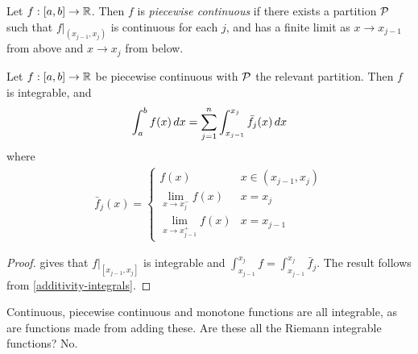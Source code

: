 \documentclass{../../template/note}
\begin{document}
    \begin{definition}
        Let \(f: [a, b] \to \mathbb R\). Then \(f\) is \emph{piecewise continuous} if there exists a partition \(\mathcal{P}\) such that \(\left.f\right|_{(x_{j-1},x_j)}\) is continuous for each \(j\), and has a finite limit as \(x \to x_{j-1}\) from above and \(x \to x_j\) from below.
    \end{definition}
    
    \begin{proposition}
        Let \(f: [a, b] \to \mathbb R\) be piecewise continuous with \(\mathcal{P}\) the relevant partition. Then \(f\) is integrable, and
        \begin{align*}
            \int_a^b f(x) \,d{x} = \sum_{j=1}^n \int_{x_{j-1}}^{x_j} \bar{f}_j(x) \,d{x}
        \end{align*}
        where
        \begin{align*}
            \bar f_j(x) = \begin{cases}
                f(x) & x \in (x_{j-1}, x_j) \\
                \lim_{x \to x_j^-}f(x) & x = x_j \\
                \lim_{x \to x_{j-1}^+}f(x) & x = x_{j-1}
            \end{cases}
        \end{align*}
    \end{proposition}

    \begin{proof}
         gives that \(\left.f\right|_{[x_{j-1},x_j]}\) is integrable and \(\int_{x_{j-1}}^{x_j} f = \int_{x_{j-1}}^{x_j} \bar f_j\). The result follows from \cref{additivity-integrals}.
    \end{proof}

    Continuous, piecewise continuous and monotone functions are all integrable, as are functions made from adding these. Are these all the Riemann integrable functions? No.
\end{document}
